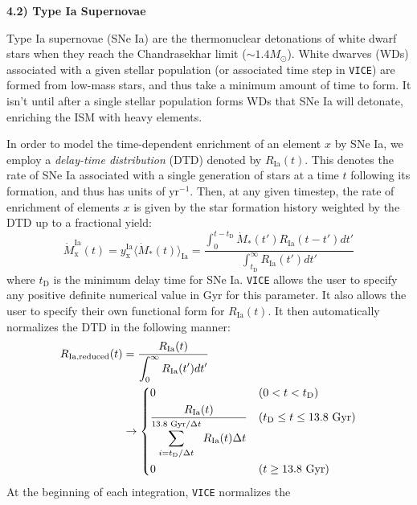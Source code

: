 \documentclass{report}
\newcommand\ddfrac[2]{\frac{\displaystyle #1}{\displaystyle #2}}
\begin{document}
\null\par\noindent
\hypertarget{sec:sneia}{\textbf{4.2) Type Ia Supernovae}} \par\noindent 
Type Ia supernovae (SNe Ia) are the thermonuclear detonations of white dwarf 
stars when they reach the Chandrasekhar limit ($\sim1.4M_\odot$). White 
dwarves (WDs) associated with a given stellar population (or associated time 
step in \texttt{VICE}) are formed from low-mass stars, and thus take a minimum 
amount of time to form. It isn't until after a single stellar population forms 
WDs that SNe Ia will detonate, enriching the ISM with heavy elements. 
\par 
In order to model the time-dependent enrichment of an element $x$ by SNe Ia, 
we employ a \textit{delay-time distribution} (DTD) denoted by $R_\text{Ia}(t)$. 
This denotes the rate of SNe Ia associated with a single generation of stars 
at a time $t$ following its formation, and thus has units of yr$^{-1}$. 
Then, at any given timestep, the rate of enrichment of elements $x$ is given 
by the star formation history weighted by the DTD up to a fractional yield: 
\begin{equation}
\dot{M}_\text{x}^\text{Ia}(t) = y_\text{x}^\text{Ia}\langle\dot{M}_*(t)
\rangle_\text{Ia} = \ddfrac{\int_0^{t-t_\text{D}} \dot{M}_*(t')
R_\text{Ia}(t - t')dt'}{\int_{t_\text{D}}^\infty R_\text{Ia}(t')dt'}
\end{equation}
where $t_\text{D}$ is the minimum delay time for SNe Ia. \texttt{VICE} allows 
the user to specify any positive definite numerical value in Gyr for this 
parameter. It also allows the user to specify their own functional form for 
$R_\text{Ia}(t)$. It then automatically normalizes the DTD in the following 
manner: 
\begin{equation}\begin{split}
\label{eq:dtd_reduced}
R_\text{Ia,reduced}(t) &= \ddfrac{R_\text{Ia}(t)}{\int_0^\infty 
R_\text{Ia}(t')dt'} \\ 
&\rightarrow 
\begin{dcases}
0 & (0 < t < t_\text{D}) \\ 
\ddfrac{R_\text{Ia}(t)}{\sum_{i = t_\text{D}/\Delta t}^{\text{13.8 Gyr}/\Delta 
t} R_\text{Ia}(t)\Delta t} & (t_\text{D} \leq t \leq \text{13.8 Gyr}) \\ 
0 & (t \geq \text{13.8 Gyr})  
\end{dcases}
\end{split}\end{equation}
At the beginning of each integration, \texttt{VICE} normalizes the 
\end{document}
